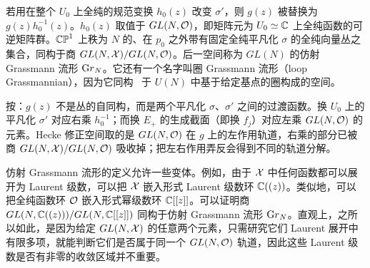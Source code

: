 若用在整个 $U_0$ 上全纯的规范变换 $h_0(z)$ 改变 $\sigma'$，则 $g(z)$ 被替换为 $g(z)h_0^{-1}(z)$。$h_0(z)$ 取值于 $GL(N,\cO)$，即矩阵元为 $U_0\simeq \CC$ 上全纯函数的可逆矩阵群。$\Bbb{CP}^1$ 上秩为 $N$ 的、在 $p_0$ 之外带有固定全纯平凡化 $\sigma$ 的全纯向量丛之集合，同构于商 $GL(N,{\cal X})/GL(N,\cO)$。后一空间称为 $GL(N)$ 的仿射 Grassmann 流形 ${\rm Gr}_N$。它还有一个名字叫圈 Grassmann 流形（loop Grassmannian），因为它同构 \cite{ref122}\ 于 $U(N)$ 中基于给定基点的圈构成的空间。

\begin{yizhu}[易错点]
按：$g(z)$ 不是丛的自同构，而是两个平凡化 $\sigma$、$\sigma'$ 之间的过渡函数。换 $U_0$ 上的平凡化 $\sigma'$ 对应右乘 $h_0^{-1}$；而换 $E_+$ 的生成截面（即换 $f_j$）对应左乘 $GL(N,\cO)$ 的元素。Hecke 修正空间取的是 $GL(N,\cO)$ 在 $g$ 上的左作用轨道，右乘的部分已被商 $GL(N,{\cal X})/GL(N,\cO)$ 吸收掉；把左右作用弄反会得到不同的轨道分解。
\end{yizhu}

仿射 Grassmann 流形的定义允许一些变体。例如，由于 ${\cal X}$ 中任何函数都可以展开为 Laurent 级数，可以把 ${\cal X}$ 嵌入形式 Laurent 级数环 $\CC((z))$。类似地，可以把全纯函数环 $\cO$ 嵌入形式幂级数环 $\CC[[z]]$。可以证明商 $GL(N,\CC((z)))/GL(N,\CC[[z]])$ 同构于仿射 Grassmann 流形 ${\rm Gr}_N$。直观上，之所以如此，是因为给定 $GL(N,{\cal X})$ 的任意两个元素，只需研究它们 Laurent 展开中有限多项，就能判断它们是否属于同一个 $GL(N,\cO)$ 轨道，因此这些 Laurent 级数是否有非零的收敛区域并不重要。

